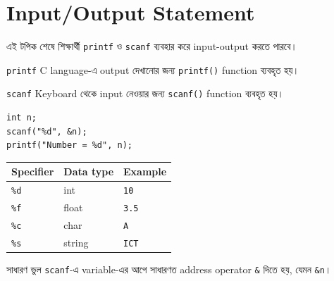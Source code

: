 \section{Input/Output Statement}

\begin{learningbox}
এই টপিক শেষে শিক্ষার্থী \texttt{printf} ও \texttt{scanf} ব্যবহার করে input-output করতে পারবে।
\end{learningbox}

\begin{definitionbox}{\texttt{printf}}
C language-এ output দেখানোর জন্য \texttt{printf()} function ব্যবহৃত হয়।
\end{definitionbox}

\begin{definitionbox}{\texttt{scanf}}
Keyboard থেকে input নেওয়ার জন্য \texttt{scanf()} function ব্যবহৃত হয়।
\end{definitionbox}

\begin{verbatim}
int n;
scanf("%d", &n);
printf("Number = %d", n);
\end{verbatim}

\begin{center}
\begin{tabular}{|p{}|p{}|p{}|}
\hline
\textbf{Specifier} & \textbf{Data type} & \textbf{Example} \\
\hline
\texttt{\%d} & int & \texttt{10} \\
\hline
\texttt{\%f} & float & \texttt{3.5} \\
\hline
\texttt{\%c} & char & \texttt{A} \\
\hline
\texttt{\%s} & string & \texttt{ICT} \\
\hline
\end{tabular}
\end{center}

\begin{mistakebox}{সাধারণ ভুল}
\texttt{scanf}-এ variable-এর আগে সাধারণত address operator \texttt{\&} দিতে হয়, যেমন \texttt{\&n}।
\end{mistakebox}
